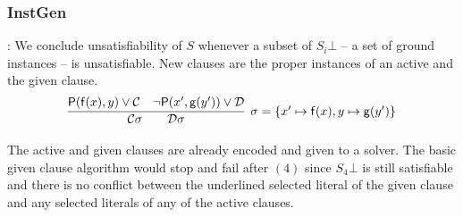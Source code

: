 \subsubsection{InstGen}

\jek : We conclude unsatisfiability of $S$ whenever a subset of $S_i\bot$ -- a set of ground instances -- is unsatisfiable. 
New clauses are the proper instances of an active and the given clause.
\begin{gather*}
	\infer[\sigma=\{ x'\mapsto\mf(x), y\mapsto\mg(y') \}]{
		\mcC\sigma \qquad \mcD\sigma
	}{
		\mP(\mf(x), y) \lor \mcC & \lnot\mP(x',\mg(y')) \lor \mcD
	}
\end{gather*}


\begin{example}[InstGen]The active and given clauses are already encoded and given to a \SAT solver.
	The basic given clause algorithm would stop and fail after $(4)$
	since $S_4\bot$ is still satisfiable and there is no conflict between the underlined selected literal of the given clause 
	and any selected literals of any of the active clauses.
	

\end{example}
